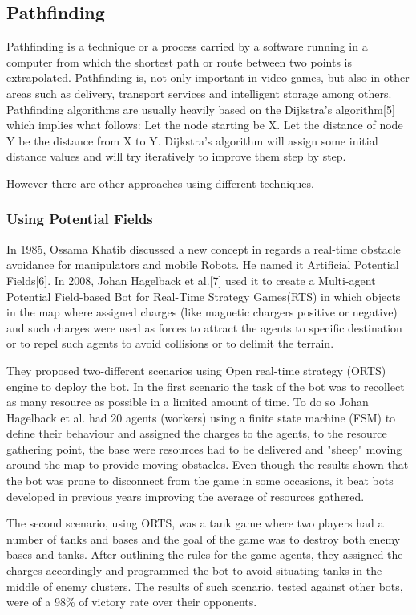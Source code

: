 \subsection{Pathfinding}


Pathfinding is a technique or a process carried by a software running in a computer from which the shortest path or route between two points is extrapolated. Pathfinding is, not only important in video games, but also in other areas such as delivery, transport services and intelligent storage among others. Pathfinding algorithms are usually heavily based on the Dijkstra's algorithm[5] which implies what follows: Let the node starting be X. Let the distance of node Y be the distance from X to Y. Dijkstra's algorithm will assign some initial distance values and will try iteratively to improve them step by step.

\vspace{2mm}
However there are other approaches using different techniques.



\subsubsection{Using Potential Fields}
In 1985, Ossama Khatib discussed a new concept in regards a real-time obstacle avoidance for manipulators and mobile Robots. He named it Artificial Potential Fields[6]. In 2008, Johan Hagelback et al.[7] used it to create a Multi-agent Potential Field-based Bot for Real-Time Strategy Games(RTS) in which objects in the map where assigned charges (like magnetic chargers positive or negative) and such charges were used as forces to attract the agents to specific destination or to repel such agents to avoid collisions or to delimit the terrain.

\vspace{2mm}
They proposed two-different scenarios using Open real-time strategy (ORTS) engine to deploy the bot. In the first scenario the task of the bot was to recollect as many resource as possible in a limited amount of time. To do so Johan Hagelback et al. had 20 agents (workers) using a finite state machine (FSM) to define their behaviour and assigned the charges to the agents, to the resource gathering point, the base were resources had to be delivered and "sheep" moving around the map to provide moving obstacles. Even though the results shown that the bot was prone to disconnect from the game in some occasions, it beat bots developed in previous years improving the average of resources gathered.

\vspace{2mm}
The second scenario, using ORTS, was a tank game where two players had a number of tanks and bases and the goal of the game was to destroy both enemy bases and tanks. After outlining the rules for the game agents, they assigned the charges accordingly and programmed the bot to avoid situating tanks in the middle of enemy clusters. The results of such scenario, tested against other bots, were of a 98\% of victory rate over their opponents.